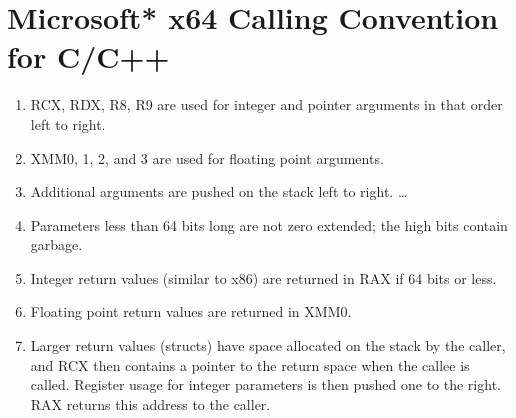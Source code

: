 \section{Microsoft* x64 Calling Convention for C/C++}\label{convention}
\begin{enumerate}  
\item RCX, RDX, R8, R9 are used for integer and pointer arguments in that order left to right.
\item XMM0, 1, 2, and 3 are used for floating point arguments.
\item Additional arguments are pushed on the stack left to right. \ldots 
\item Parameters less than 64 bits long are not zero extended; the high bits contain garbage.
\item Integer return values (similar to x86) are returned in RAX if 64 bits or less.
\item Floating point return values are returned in XMM0.
\item Larger return values (structs) have space allocated on the stack by the caller, and RCX then contains a pointer to the return space when the callee is called. Register usage for integer parameters is then pushed one to the right. RAX returns this address to the caller.
\end{enumerate}

